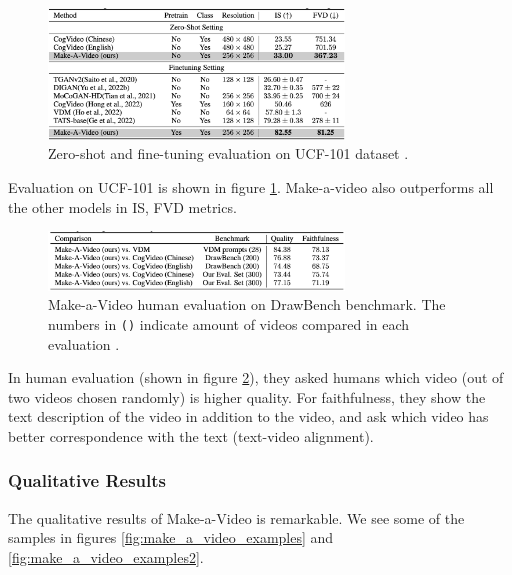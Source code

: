 \begin{figure}[h]
    \centering
    \includegraphics[width=0.7\textwidth]{images/make_a_video/ucf_101.png}
    \caption{Zero-shot and fine-tuning evaluation on UCF-101 dataset \cite{make_a_video}.}
    \label{fig:make_a_video_ucf_101}
\end{figure}

Evaluation on UCF-101 is shown in figure \ref{fig:make_a_video_ucf_101}. Make-a-video also outperforms all the other models in IS, FVD metrics.

\begin{figure}[h]
    \centering
    \includegraphics[width=0.7\textwidth]{images/make_a_video/eval.png}
    \caption{Make-a-Video human evaluation on DrawBench benchmark. The numbers in \texttt{()} indicate amount of videos compared in each evaluation \cite{make_a_video}.}
    \label{fig:make_a_video_human_eval}
\end{figure}

In human evaluation (shown in figure \ref{fig:make_a_video_human_eval}), they asked humans which video (out of two videos chosen randomly) is higher quality. For faithfulness, they show the text description of the video in addition to the video, and ask which video has better correspondence with the text (text-video alignment).




\subsubsection{Qualitative Results}

The qualitative results of Make-a-Video is remarkable. We see some of the samples in figures \ref{fig:make_a_video_examples} and \ref{fig:make_a_video_examples2}.

